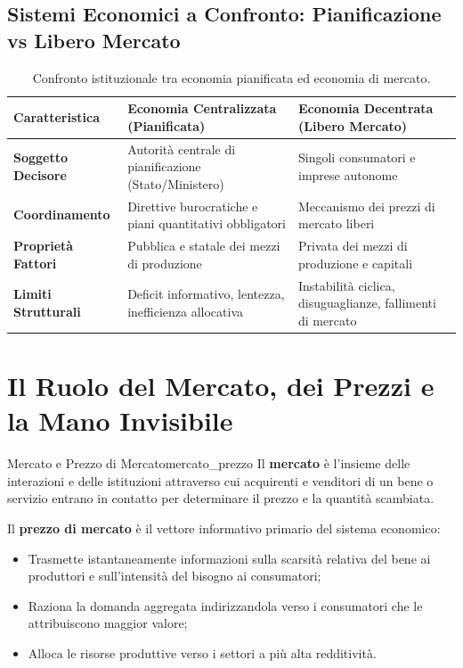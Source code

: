 \subsection{Sistemi Economici a Confronto: Pianificazione vs Libero Mercato}

\begin{table}[htbp]
\centering
\small
\renewcommand{\arraystretch}{1.3}
\begin{tabularx}{\textwidth}{lXX}
\toprule
\textbf{Caratteristica} & \textbf{Economia Centralizzata (Pianificata)} & \textbf{Economia Decentrata (Libero Mercato)} \\
\midrule
\textbf{Soggetto Decisore} & Autorità centrale di pianificazione (Stato/Ministero) & Singoli consumatori e imprese autonome \\
\textbf{Coordinamento} & Direttive burocratiche e piani quantitativi obbligatori & Meccanismo dei prezzi di mercato liberi \\
\textbf{Proprietà Fattori} & Pubblica e statale dei mezzi di produzione & Privata dei mezzi di produzione e capitali \\
\textbf{Limiti Strutturali} & Deficit informativo, lentezza, inefficienza allocativa & Instabilità ciclica, disuguaglianze, fallimenti di mercato \\
\bottomrule
\end{tabularx}
\caption{Confronto istituzionale tra economia pianificata ed economia di mercato.}
\label{tab:sistemi_economici}
\end{table}

\section{Il Ruolo del Mercato, dei Prezzi e la Mano Invisibile}

\begin{definizione}{Mercato e Prezzo di Mercato}{mercato_prezzo}
Il \textbf{mercato} è l'insieme delle interazioni e delle istituzioni attraverso cui acquirenti e venditori di un bene o servizio entrano in contatto per determinare il prezzo e la quantità scambiata.

Il \textbf{prezzo di mercato} è il vettore informativo primario del sistema economico:
\begin{itemize}
    \item Trasmette istantaneamente informazioni sulla scarsità relativa del bene ai produttori e sull'intensità del bisogno ai consumatori;
    \item Raziona la domanda aggregata indirizzandola verso i consumatori che le attribuiscono maggior valore;
    \item Alloca le risorse produttive verso i settori a più alta redditività.
\end{itemize}
\end{definizione}

